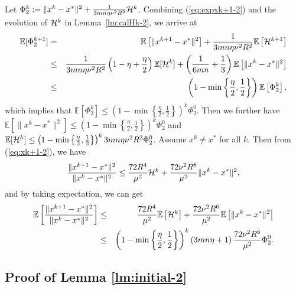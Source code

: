 \documentclass[10pt]{article}
\newcommand{\eqdef}{\; { := }\;}
\newcommand{\ExpBr}[1]{\mathbb{E}\left[#1\right]}
\begin{document}
Let $\Phi_2^k \eqdef \|x^{k} - x^*\|^2 + \frac{1}{3mn\eta  \nu^2 R^2} {\cal H}^{k}$. Combining (\ref{eq:expxk+1-2}) and the evolution of ${\cal H}^k$ in Lemma~\ref{lm:calHk-2}, we arrive at 
\begin{eqnarray*}
	\mathbb{E}[\Phi_2^{k+1}] &=& \ExpBr{\|x^{k+1} - x^*\|^2} + \frac{1}{3mn\eta  \nu^2 R^2}  \ExpBr{{\cal H}^{k+1}} \\ 
	&\leq&  \frac{1}{3mn \eta \nu^2 R^2} \left(  1 - \eta + \frac{\eta}{2}  \right) \mathbb{E}[{\cal H}^k] + \left(  \frac{1}{6mn} + \frac{1}{3}  \right)\ExpBr{\|x^k - x^*\|^2 }\\ 
	&\leq& \left(  1 - \min \left\{  \frac{\eta}{2}, \frac{1}{2}  \right\}  \right) \ExpBr{\Phi_2^k}, 
\end{eqnarray*}
which implies that $\ExpBr{\Phi_2^k}\leq  \left(  1 - \min \left\{  \frac{\eta}{2}, \frac{1}{2}  \right\}  \right)^k \Phi_2^0$. Then we further have $\ExpBr{\|x^k - x^*\|^2} \leq  \left(  1 - \min \left\{  \frac{\eta}{2}, \frac{1}{2}  \right\}  \right)^k \Phi_2^0$ and $\mathbb{E}[{\cal H}^k] \leq  \left(  1 - \min \left\{  \frac{\eta}{2}, \frac{1}{2}  \right\}  \right)^k 3mn\eta \nu^2 R^2 \Phi_2^0$. Assume $x^k \neq x^*$ for all $k$. Then from (\ref{eq:xk+1-2}), we have 
$$
\frac{\|x^{k+1} - x^*\|^2}{\|x^k - x^*\|^2 } \leq \frac{72R^4}{ \mu^2} {\cal H}^k + \frac{72 \nu^2 R^6}{\mu^2}\|x^k - x^*\|^2, 
$$
and by taking expectation, we can get 
\begin{eqnarray*}
	\mathbb{E} \left[  \frac{\|x^{k+1} - x^*\|^2}{\|x^k - x^*\|^2 }  \right] &\leq& \frac{72R^4}{ \mu^2}\ExpBr{{\cal H}^k} + \frac{72 \nu^2 R^6}{\mu^2} \ExpBr{\|x^k - x^*\|^2} \\ 
	&\leq& \left(  1 - \min \left\{  \frac{\eta}{2}, \frac{1}{2}  \right\}  \right)^k  \left(  {3mn\eta} + 1  \right) \frac{72\nu^2 R^6}{\mu^2} \Phi_2^0. 
\end{eqnarray*}




\subsection{Proof of Lemma \ref{lm:initial-2}}
\end{document}
